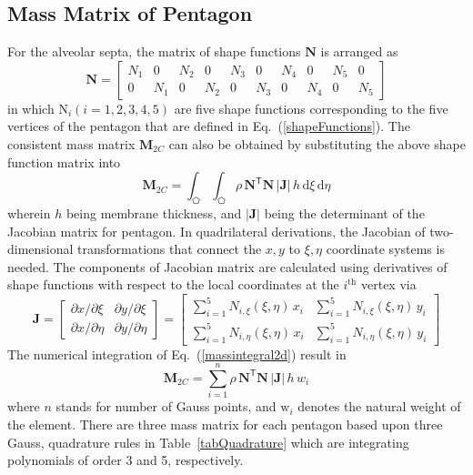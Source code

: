 \subsection{Mass Matrix of Pentagon}
For the alveolar septa, the matrix of shape functions $\mathbf{N}$ is arranged as
 \begin{equation}
	\mathbf{N} = 
	\begin{bmatrix}
	N_1 & 0 & N_2 & 0 & N_3 & 0 & N_4 & 0 & N_5 & 0 \\ 0 & N_1 & 0 & N_2 & 0 & N_3 & 0 & N_4 & 0 & N_5 
\end{bmatrix} 
	\label{shape2D}
\end{equation}
in which $\mathrm{N}_i (i = 1, 2, 3, 4, 5)$ are five shape functions corresponding to the five vertices of the pentagon that are defined in Eq.~(\ref{shapeFunctions}).
The consistent mass matrix $\mathbf{M}_{2C}$ can also be obtained by substituting the above shape function matrix into 
\begin{equation}
    \mathbf{M}_{2C} = \int_{\pentagon} \int_{\pentagon} \rho \, \mathbf{N}^{\mathsf{T}} \mathbf{N} \,|\mathbf{J}| \, h \, \mathrm{d} \xi \, \mathrm{d} \eta
    \label{massintegral2d}
\end{equation}
wherein $h$ being membrane thickness, and $|\mathbf{J}|$ being the determinant of the Jacobian matrix for pentagon. 
In quadrilateral derivations,  the Jacobian of two-dimensional transformations that connect the ${x, y}$ to ${\xi, \eta}$ coordinate systems is needed. The components of Jacobian matrix are calculated using derivatives of shape functions with respect to the local coordinates at the $i^{\mathrm{th}}$ vertex via
\begin{equation}
\mathbf{J} = 
\begin{bmatrix}
\partial x / \partial\xi & \partial y / \partial\xi \\
\partial x / \partial\eta & \partial y / \partial\eta 
\end{bmatrix}  
= \begin{bmatrix}
\sum\nolimits_{i=1}^5 N_{i,\xi} (\xi,\eta) \, x_i & \sum\nolimits_{i=1}^5 N_{i,\xi} (\xi,\eta) \, y_i \\
\sum\nolimits_{i=1}^5 N_{i,\eta} (\xi,\eta) \, x_i & \sum\nolimits_{i=1}^5 N_{i,\eta} (\xi,\eta) \, y_i
\end{bmatrix}
\label{jacobianpent}
\end{equation}
The numerical integration of Eq.~(\ref{massintegral2d}) result in 
\begin{equation}
    \mathbf{M}_{2C} = \sum_{i=1}^{n} \rho \, \mathbf{N}^{\mathsf{T}} \mathbf{N} \,|\mathbf{J}| \, h \, w_i
\end{equation}
where $n$ stands for number of Gauss points, and $\mathrm{w}_i$ denotes the natural weight of the element.
There are three mass matrix for each pentagon based upon three Gauss, quadrature rules in Table~\ref{tabQuadrature} which are integrating polynomials of order 3 and 5, respectively. 

